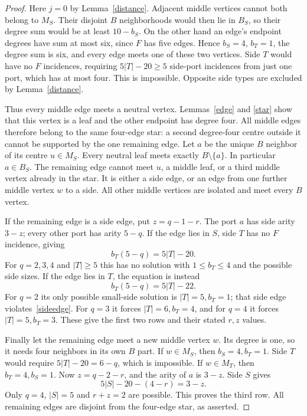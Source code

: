 \documentclass[11pt]{article}
\begin{document}
\begin{proof}
Here $j=0$ by Lemma~\ref{distance}. Adjacent middle vertices cannot both
belong to $M_S$. Their disjoint $B$ neighborhoods would then lie in
$B_S$, so their degree sum would be at least $10-b_S$. On the other hand
an edge's endpoint degrees have sum at most six, since $F$ has five
edges. Hence $b_S=4$, $b_T=1$, the degree sum is six, and every edge
meets one of these two vertices. Side $T$ would have no $F$ incidences,
requiring $5|T|-20\geq5$ side-port incidences from just one port, which
has at most four. This is impossible. Opposite side types are excluded
by Lemma~\ref{distance}.

Thus every middle edge meets a neutral vertex. Lemmas~\ref{edge} and
\ref{star} show that this vertex is a leaf and the other endpoint has
degree four. All middle edges therefore belong to the same four-edge
star: a second degree-four centre outside it cannot be supported by the
one remaining edge. Let $a$ be the unique $B$ neighbor of its centre
$u\in M_S$. Every neutral leaf meets exactly $B\setminus\{a\}$.
In particular $a\in B_S$. The remaining edge cannot meet $u$, a middle
leaf, or a third middle vertex already in the star. It is either a
side edge, or an edge from one further middle vertex $w$ to a side.
All other middle vertices are isolated and meet every $B$ vertex.

If the remaining edge is a side edge, put $z=q-1-r$. The port $a$ has
side arity $3-z$; every other port has arity $5-q$. If the edge lies
in $S$, side $T$ has no $F$ incidence, giving
\[
 b_T(5-q)=5|T|-20.
\]
For $q=2,3,4$ and $|T|\geq5$ this has no solution with
$1\leq b_T\leq4$ and the possible side sizes. If the edge lies in $T$,
the equation is instead
\[
 b_T(5-q)=5|T|-22.
\]
For $q=2$ its only possible small-side solution is $|T|=5,b_T=1$;
that side edge violates~\eqref{sideedge}. For $q=3$ it forces
$|T|=6,b_T=4$, and for $q=4$ it forces $|T|=5,b_T=3$.
These give the first two rows and their stated $r,z$ values.

Finally let the remaining edge meet a new middle vertex $w$. Its degree
is one, so it needs four neighbors in its own $B$ part. If $w\in M_S$,
then $b_S=4,b_T=1$. Side $T$ would require
$5|T|-20=6-q$, which is impossible. If $w\in M_T$, then
$b_T=4,b_S=1$. Now $z=q-2-r$, and the arity of $a$ is $3-z$.
Side $S$ gives
\[
 5|S|-20-(4-r)=3-z.
\]
Only $q=4$, $|S|=5$ and $r+z=2$ are possible. This proves the third row.
All remaining edges are disjoint from the four-edge star, as asserted.
\end{proof}
\end{document}
